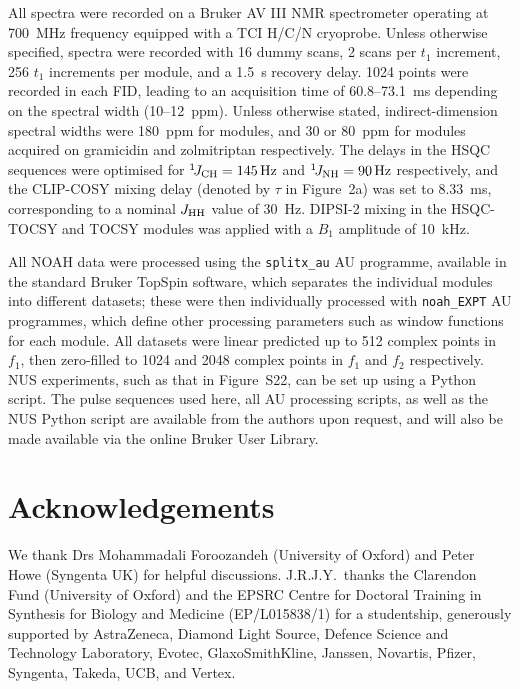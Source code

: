 \documentclass[final,twocolumn]{elsarticle}
\newcommand*{\carbon}{\ce{^{13}C}}
\newcommand*{\proton}{\ce{^{1}H}}
\newcommand*{\nitrogen}{\ce{^{15}N}}
\newcommand*{\onejch}{{}^{1}\!J_{\ce{CH}}}
\newcommand*{\onejnh}{{}^{1}\!J_{\ce{NH}}}
\newcommand*{\jhh}{J_{\ce{HH}}}
\begin{document}
All spectra were recorded on a Bruker AV III NMR spectrometer operating at \SI{700}{\MHz} \proton{} frequency equipped with a TCI H/C/N cryoprobe.
Unless otherwise specified, spectra were recorded with 16 dummy scans, 2 scans per $t_1$ increment, 256 $t_1$ increments per module, and a \SI{1.5}{\s} recovery delay.
1024 points were recorded in each FID, leading to an acquisition time of 60.8--\SI{73.1}{\ms} depending on the \proton{} spectral width (10--\SI{12}{ppm}).
Unless otherwise stated, indirect-dimension spectral widths were \SI{180}{ppm} for \carbon{} modules, and 30 or \SI{80}{ppm} for \nitrogen{} modules acquired on gramicidin and zolmitriptan respectively.
The delays in the HSQC sequences were optimised for $\onejch = \SI{145}{\Hz}$ and $\onejnh = \SI{90}{\Hz}$ respectively, and the CLIP-COSY mixing delay (denoted by $\tau$ in Figure~2a) was set to \SI{8.33}{\ms}, corresponding to a nominal $\jhh$ value of \SI{30}{Hz}.
DIPSI-2 mixing in the HSQC-TOCSY and TOCSY modules was applied with a $B_1$ amplitude of \SI{10}{\kHz}.

All NOAH data were processed using the \texttt{splitx\_au} AU programme, available in the standard Bruker TopSpin software, which separates the individual modules into different datasets; these were then individually processed with \texttt{noah\_EXPT} AU programmes, which define other processing parameters such as window functions for each module.
All datasets were linear predicted up to 512 complex points in $f_1$, then zero-filled to 1024 and 2048 complex points in $f_1$ and $f_2$ respectively.
NUS experiments, such as that in Figure~S22, can be set up using a Python script.
The pulse sequences used here, all AU processing scripts, as well as the NUS Python script are available from the authors upon request, and will also be made available via the online Bruker User Library.

\section*{Acknowledgements}
We thank Drs Mohammadali Foroozandeh (University of Oxford) and Peter Howe (Syngenta UK) for helpful discussions.
J.R.J.Y.\ thanks the Clarendon Fund (University of Oxford) and the EPSRC Centre for Doctoral Training in Synthesis for Biology and Medicine (EP/L015838/1) for a studentship, generously supported by AstraZeneca, Diamond Light Source, Defence Science and Technology Laboratory, Evotec, GlaxoSmithKline, Janssen, Novartis, Pfizer, Syngenta, Takeda, UCB, and Vertex.



\end{document}
